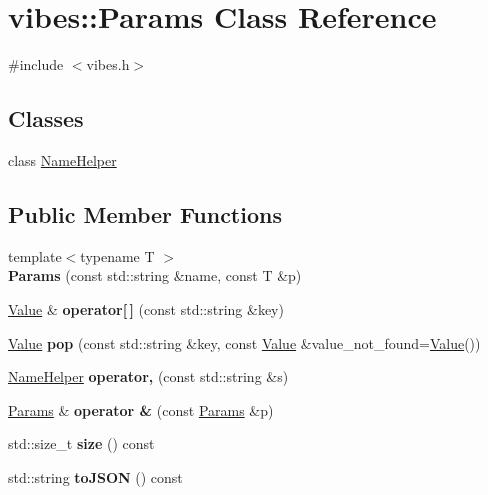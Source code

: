 \hypertarget{classvibes_1_1_params}{}\section{vibes\+:\+:Params Class Reference}
\label{classvibes_1_1_params}


{\ttfamily \#include $<$vibes.\+h$>$}

\subsection*{Classes}
\begin{DoxyCompactItemize}
\item 
class \hyperlink{classvibes_1_1_params_1_1_name_helper}{Name\+Helper}
\end{DoxyCompactItemize}
\subsection*{Public Member Functions}
\begin{DoxyCompactItemize}
\item 
\mbox{\label{classvibes_1_1_params_a74da0dac9f8e82d1f14b6a8b656934e1}} 
{\footnotesize template$<$typename T $>$ }\\{\bfseries Params} (const std\+::string \&name, const T \&p)
\item 
\mbox{\label{classvibes_1_1_params_aba283c824eec1a7afda578fdaa27d632}} 
\hyperlink{classvibes_1_1_value}{Value} \& {\bfseries operator\mbox{[}$\,$\mbox{]}} (const std\+::string \&key)
\item 
\mbox{\label{classvibes_1_1_params_a1746872928fcc0b00bcee7c232d1d624}} 
\hyperlink{classvibes_1_1_value}{Value} {\bfseries pop} (const std\+::string \&key, const \hyperlink{classvibes_1_1_value}{Value} \&value\+\_\+not\+\_\+found=\hyperlink{classvibes_1_1_value}{Value}())
\item 
\hyperlink{classvibes_1_1_params_1_1_name_helper}{Name\+Helper} {\bfseries operator,} (const std\+::string \&s)
\item 
\mbox{\label{classvibes_1_1_params_abdf3de906b9407e609ba5782663abe86}} 
\hyperlink{classvibes_1_1_params}{Params} \& {\bfseries operator \&} (const \hyperlink{classvibes_1_1_params}{Params} \&p)
\item 
\mbox{\label{classvibes_1_1_params_aea66b244f8b05bb8d9380b1f7f536520}} 
std\+::size\+\_\+t {\bfseries size} () const
\item 
\mbox{\label{classvibes_1_1_params_a995ec25926bee9221296f73ff18dfd1d}} 
std\+::string {\bfseries to\+J\+S\+ON} () const
\end{DoxyCompactItemize}



